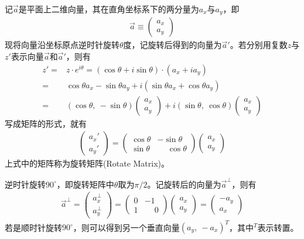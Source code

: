 \begin{example}[平面向量的旋转]
  记$\vec a$是平面上二维向量，其在直角坐标系下的两分量为$a_x$与$a_y$，即
  \begin{align*}
    \vec a\equiv
    \begin{pmatrix}
      a_x\\ a_y
    \end{pmatrix}
  \end{align*}
  现将向量沿坐标原点逆时针旋转$\theta$度，记旋转后得到的向量为$\vec a'$。若分别用复数$z$与$z'$表示向量$\vec a$和$\vec a'$，则有
  \begin{align*}
    z' ={}& z\cdot e^{i\theta} = (\cos\theta + i\sin\theta)\cdot (a_x + i a_y)\\
       ={}& \cos\theta a_x - \sin\theta a_y + i(\sin\theta a_x + \cos\theta a_y)\\
       ={}& (\cos\theta,\ -\sin\theta)\begin{pmatrix}a_x\\a_y\end{pmatrix} + i
            (\sin\theta,\  \cos\theta)\begin{pmatrix}a_x\\a_y\end{pmatrix}
  \end{align*}
  写成矩阵的形式，就有
  \begin{align*}
    \begin{pmatrix}
      a_x'\\ a_y'
    \end{pmatrix}=
    \begin{pmatrix}
      \cos\theta & -\sin\theta\\
      \sin\theta & \phantom{-}\cos\theta
    \end{pmatrix}
    \begin{pmatrix}
      a_x\\ a_y
    \end{pmatrix}
  \end{align*}
  上式中的矩阵称为旋转矩阵(Rotate Matrix)。
\end{example}

\begin{example}[垂直向量]
  逆时针旋转$90^\circ$，即旋转矩阵中$\theta$取为$\pi/2$。记旋转后的向量为$\vec a^\perp$，则有
  \begin{align*}
    \vec a^\perp = 
    \begin{pmatrix}
      a_x^\perp\\ a_y^\perp
    \end{pmatrix}=
    \begin{pmatrix}
      0 & -1\\
      1 & \phantom{-}0
    \end{pmatrix}
    \begin{pmatrix}
      a_x\\ a_y
    \end{pmatrix}=
    \begin{pmatrix}
      -a_y\\ a_x
    \end{pmatrix}
  \end{align*}
  若是顺时针旋转$90^\circ$，则可以得到另一个垂直向量$(a_y,\ -a_x)^T$，其中$^T$表示转置。
\end{example}

